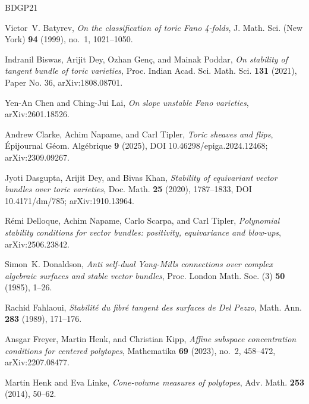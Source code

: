 \documentclass[11pt]{amsart}
\theoremstyle{definition}
\theoremstyle{remark}
\begin{document}
\providecommand{\MR}{\relax\ifhmode\unskip\space\fi MR }
\providecommand{\MRhref}[2]{%
  \href{http://www.ams.org/mathscinet-getitem?mr=#1}{#2}
}
\providecommand{\href}[2]{#2}
\begin{thebibliography}{BDGP21}

Victor~V. Batyrev, \emph{On the classification of toric {F}ano 4-folds}, J.
  Math. Sci. (New York) \textbf{94} (1999), no.~1, 1021--1050.

Indranil Biswas, Arijit Dey, Ozhan Gen\c{c}, and Mainak Poddar, \emph{On
  stability of tangent bundle of toric varieties}, Proc. Indian Acad. Sci.
  Math. Sci. \textbf{131} (2021), Paper No. 36, arXiv:1808.08701.

Yen-An Chen and Ching-Jui Lai, \emph{On slope unstable {F}ano varieties},
  arXiv:2601.18526.

Andrew Clarke, Achim Napame, and Carl Tipler, \emph{Toric sheaves and flips},
  \'Epijournal G\'eom. Alg\'ebrique \textbf{9} (2025), DOI
  10.46298/epiga.2024.12468; arXiv:2309.09267.

Jyoti Dasgupta, Arijit Dey, and Bivas Khan, \emph{Stability of equivariant
  vector bundles over toric varieties}, Doc. Math. \textbf{25} (2020),
  1787--1833, DOI 10.4171/dm/785; arXiv:1910.13964.

R\'emi Delloque, Achim Napame, Carlo Scarpa, and Carl Tipler, \emph{Polynomial
  stability conditions for vector bundles: positivity, equivariance and
  blow-ups}, arXiv:2506.23842.

Simon~K. Donaldson, \emph{Anti self-dual {Y}ang-{M}ills connections over
  complex algebraic surfaces and stable vector bundles}, Proc. London Math.
  Soc. (3) \textbf{50} (1985), 1--26.

Rachid Fahlaoui, \emph{Stabilit\'e du fibr\'e tangent des surfaces de {D}el
  {P}ezzo}, Math. Ann. \textbf{283} (1989), 171--176.

Ansgar Freyer, Martin Henk, and Christian Kipp, \emph{Affine subspace
  concentration conditions for centered polytopes}, Mathematika \textbf{69}
  (2023), no.~2, 458--472, arXiv:2207.08477.

Martin Henk and Eva Linke, \emph{Cone-volume measures of polytopes}, Adv. Math.
  \textbf{253} (2014), 50--62.


\end{thebibliography}
\end{document}
